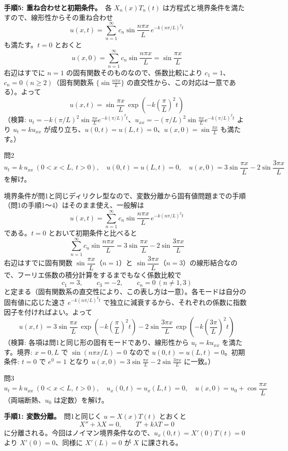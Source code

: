 \documentclass[a4paper,11pt]{article}
\begin{document}
\textbf{手順5: 重ね合わせと初期条件。}\ 各 $X_n(x)T_n(t)$ は方程式と境界条件を満たすので、線形性からその重ね合わせ
\[
u(x,t) = \sum_{n=1}^{\infty} c_n \sin\frac{n\pi x}{L}\,e^{-k(n\pi/L)^2 t}
\]
も満たす。$t=0$ とおくと
\[
u(x,0) = \sum_{n=1}^{\infty} c_n \sin\frac{n\pi x}{L} = \sin\frac{\pi x}{L}
\]
右辺はすでに $n=1$ の固有関数そのものなので、係数比較により $c_1 = 1$、$c_n = 0\ (n \ge 2)$（固有関数系 $\{\sin\frac{n\pi x}{L}\}$ の直交性から、この対応は一意である）。よって
\[
\boxed{\; u(x,t) = \sin\frac{\pi x}{L}\,\exp\!\left(-k\left(\frac{\pi}{L}\right)^{2} t\right) \;}
\]
（検算: $u_t = -k(\pi/L)^2 \sin\frac{\pi x}{L}e^{-k(\pi/L)^2t}$、$u_{xx} = -(\pi/L)^2\sin\frac{\pi x}{L}e^{-k(\pi/L)^2t}$ より $u_t = k u_{xx}$ が成り立ち、$u(0,t)=u(L,t)=0$、$u(x,0)=\sin\frac{\pi x}{L}$ も満たす。）

\clearpage
\begin{mondaiboxS}{問2}
\[
u_t = k\,u_{xx}\ (0<x<L,\ t>0), \quad u(0,t)=u(L,t)=0, \quad u(x,0) = 3\sin\frac{\pi x}{L} - 2\sin\frac{3\pi x}{L}
\]
を解け。
\end{mondaiboxS}
\kaitou
境界条件が問1と同じディリクレ型なので、変数分離から固有値問題までの手順（問1の手順1〜4）はそのまま使え、一般解は
\[
u(x,t) = \sum_{n=1}^\infty c_n \sin\frac{n\pi x}{L}\,e^{-k(n\pi/L)^2 t}
\]
である。$t = 0$ とおいて初期条件と比べると
\[
\sum_{n=1}^\infty c_n \sin\frac{n\pi x}{L} = 3\sin\frac{\pi x}{L} - 2\sin\frac{3\pi x}{L}
\]
右辺はすでに固有関数 $\sin\dfrac{\pi x}{L}$（$n=1$）と $\sin\dfrac{3\pi x}{L}$（$n=3$）の線形結合なので、フーリエ係数の積分計算をするまでもなく係数比較で
\[
c_1 = 3, \qquad c_3 = -2, \qquad c_n = 0\ (n \neq 1, 3)
\]
と定まる（固有関数系の直交性により、この表し方は一意）。各モードは自分の固有値に応じた速さ $e^{-k(n\pi/L)^2 t}$ で独立に減衰するから、それぞれの係数に指数因子を付ければよい。よって
\[
\boxed{\; u(x,t) = 3\sin\frac{\pi x}{L}\,\exp\!\left(-k\left(\frac{\pi}{L}\right)^{2} t\right) - 2\sin\frac{3\pi x}{L}\,\exp\!\left(-k\left(\frac{3\pi}{L}\right)^{2} t\right) \;}
\]
（検算: 各項は問1と同じ形の固有モードであり、線形性から $u_t = k u_{xx}$ を満たす。境界: $x=0,L$ で $\sin(n\pi x/L)=0$ なので $u(0,t)=u(L,t)=0$。初期条件: $t=0$ で $e^{0}=1$ となり $u(x,0)=3\sin\frac{\pi x}{L}-2\sin\frac{3\pi x}{L}$ に一致。）

\clearpage
\begin{mondaiboxS}{問3}
\[
u_t = k\,u_{xx}\ (0<x<L,\ t>0), \quad u_x(0,t)=u_x(L,t)=0, \quad u(x,0) = u_0 + \cos\frac{\pi x}{L}
\]
（両端断熱、$u_0$ は定数）を解け。
\end{mondaiboxS}
\kaitou
\textbf{手順1: 変数分離。}\ 問1と同じく $u = X(x)T(t)$ とおくと
\[
X'' + \lambda X = 0, \qquad T' + k\lambda T = 0
\]
に分離される。今回はノイマン境界条件なので、$u_x(0,t) = X'(0)T(t) = 0$ より $X'(0) = 0$、同様に $X'(L) = 0$ が $X$ に課される。
\end{document}
